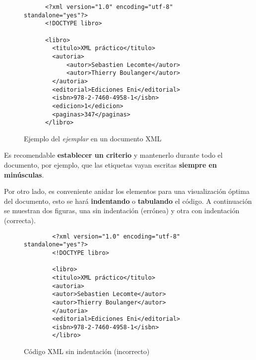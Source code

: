 \begin{figure}[h]
    \begin{tcolorbox}[sharp corners, colback=yellow!30, colframe=white!20]
        \scriptsize
        \begin{verbatim}
      <?xml version="1.0" encoding="utf-8" standalone="yes"?>
      <!DOCTYPE libro>

      <libro>
        <titulo>XML práctico</titulo>
        <autoria>
            <autor>Sebastien Lecomte</autor>
            <autor>Thierry Boulanger</autor>
        </autoria>
        <editorial>Ediciones Eni</editorial>
        <isbn>978-2-7460-4958-1</isbn>
        <edicion>1</edicion>
        <paginas>347</paginas>
      </libro>
        \end{verbatim}
    \end{tcolorbox}
    \caption{Ejemplo del \textit{ejemplar} en un documento XML}
\end{figure}

Es recomendable \textbf{establecer un criterio} y mantenerlo durante todo el documento, por ejemplo, que las etiquetas vayan escritas \textbf{siempre en minúsculas}.

Por otro lado, es conveniente anidar los elementos para una visualización óptima del documento, esto se hará \textbf{indentando} o \textbf{tabulando} el código. A continuación se muestran dos figuras, una sin indentación (errónea) y otra con indentación (correcta).

\begin{figure}[h]
    \begin{tcolorbox}[sharp corners, colback=yellow!30, colframe=white!20]
        \scriptsize
        \begin{verbatim}
        <?xml version="1.0" encoding="utf-8" standalone="yes"?>
        <!DOCTYPE libro>

        <libro>
        <titulo>XML práctico</titulo>
        <autoria>
        <autor>Sebastien Lecomte</autor>
        <autor>Thierry Boulanger</autor>
        </autoria>
        <editorial>Ediciones Eni</editorial>
        <isbn>978-2-7460-4958-1</isbn>
        </libro>
        \end{verbatim}
    \end{tcolorbox}
    \caption{Código XML sin indentación (incorrecto)}
\end{figure}


